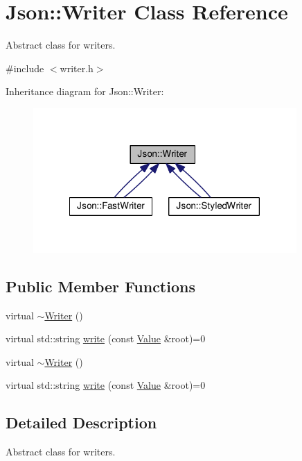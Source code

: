 \hypertarget{classJson_1_1Writer}{\section{Json\-:\-:Writer Class Reference}
\label{d2/d04/classJson_1_1Writer}
}


Abstract class for writers.  




{\ttfamily \#include $<$writer.\-h$>$}



Inheritance diagram for Json\-:\-:Writer\-:
\nopagebreak
\begin{figure}[H]
\begin{center}
\leavevmode
\includegraphics[width=285pt]{d8/de4/classJson_1_1Writer__inherit__graph}
\end{center}
\end{figure}
\subsection*{Public Member Functions}
\begin{DoxyCompactItemize}
\item 
virtual \hyperlink{classJson_1_1Writer_a1414aeff9958fa970c6ac2e352786186}{$\sim$\-Writer} ()
\item 
virtual std\-::string \hyperlink{classJson_1_1Writer_a7b2273a4ffd6f32b369ac8a53b7b5a0d}{write} (const \hyperlink{classJson_1_1Value}{Value} \&root)=0
\item 
virtual \hyperlink{classJson_1_1Writer_a1414aeff9958fa970c6ac2e352786186}{$\sim$\-Writer} ()
\item 
virtual std\-::string \hyperlink{classJson_1_1Writer_a7b2273a4ffd6f32b369ac8a53b7b5a0d}{write} (const \hyperlink{classJson_1_1Value}{Value} \&root)=0
\end{DoxyCompactItemize}


\subsection{Detailed Description}
Abstract class for writers. 

